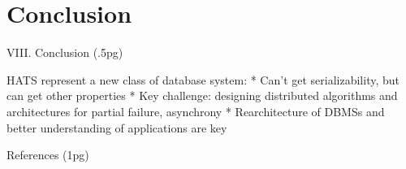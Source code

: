 
\section{Conclusion}

VIII. Conclusion (.5pg)

HATS represent a new class of database system:
* Can't get serializability, but can get other properties
* Key challenge: designing distributed algorithms and architectures for partial failure, asynchrony
* Rearchitecture of DBMSs and better understanding of applications are key

References (1pg)


